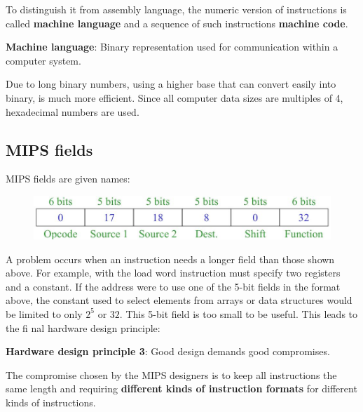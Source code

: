 \documentclass[10pt,a4paper]{article}
\begin{document}
To distinguish it from assembly language, the numeric version of instructions is called
\textbf{machine language} and a sequence of such instructions \textbf{machine code}.
\begin{tcolorbox}[breakable,colback=white]
\textbf{Machine language}: Binary representation used for communication within a computer system.
\end{tcolorbox}
Due to long binary numbers, using a higher base that can convert easily into binary, is much more
efficient. Since  all computer data sizes are multiples of 4, hexadecimal numbers are used.

\pagebreak
\subsection{MIPS fields}

MIPS fields are given names:
\begin{figure} [h!]
    \centering
    \includegraphics[scale=0.5]{MIPS field.JPG}
\end{figure}

A problem occurs when an instruction needs a longer field than those shown above. For example, with
the load word instruction must specify two registers and a constant. If the address were to use one
of the 5-bit fields in the format above, the constant used to select elements from arrays or data
structures would be limited to only $2^5$  or $32$. This 5-bit field is too small to be useful. This
leads to the fi nal hardware design principle: 
\begin{tcolorbox}[breakable,colback=white]
\textbf{Hardware design principle 3}: Good design demands good compromises. 
\end{tcolorbox}
The compromise chosen by the MIPS designers is to keep all instructions the same length and
requiring \textbf{different kinds of instruction formats} for different kinds of instructions.
\end{document}
